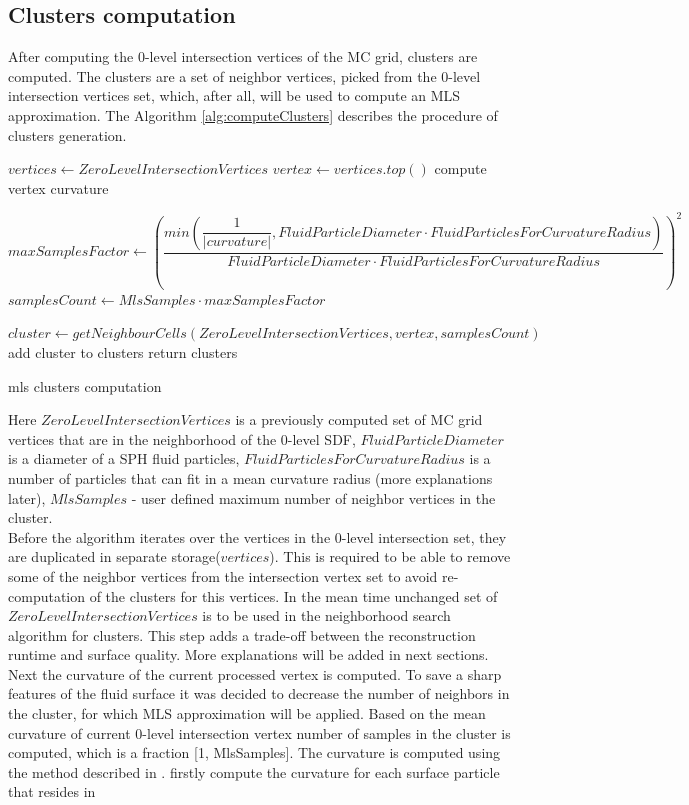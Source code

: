 \subsection{Clusters computation}
After computing the 0-level intersection vertices of the MC grid, clusters are computed. The clusters are a set of neighbor vertices, picked from the 0-level intersection vertices set, which, after all, will be used to compute an MLS approximation. The Algorithm \ref{alg:computeClusters} describes the procedure of clusters generation.
\begin{algorithm}[H]
	\scriptsize
	\begin{algorithmic}
			\State $vertices \gets ZeroLevelIntersectionVertices$
				\State $vertex \gets vertices.top()$
				\State compute vertex curvature

				\State $maxSamplesFactor \gets \left(\dfrac{min(\dfrac{1}{|curvature|}, FluidParticleDiameter \cdot FluidParticlesForCurvatureRadius)}{FluidParticleDiameter \cdot FluidParticlesForCurvatureRadius}\right)^2$
				\State $samplesCount \gets MlsSamples \cdot maxSamplesFactor$

				\State $cluster \gets getNeighbourCells(ZeroLevelIntersectionVertices, vertex, samplesCount)$
				\State add cluster to clusters
			\EndWhile
			\State return clusters
	\end{algorithmic}
	\caption{mls clusters computation}
	\label{alg:computeClusters}
\end{algorithm}
Here $ZeroLevelIntersectionVertices$ is a previously computed set of MC grid vertices  that are in the neighborhood of the 0-level SDF,  
$FluidParticleDiameter$ is a diameter of a SPH fluid particles, $FluidParticlesForCurvatureRadius$ is a number of particles that can fit in a mean curvature radius (more explanations later), $MlsSamples$ - user defined maximum number of neighbor vertices in the cluster.\\
Before the algorithm iterates over the vertices in the 0-level intersection set, they are duplicated in separate storage($vertices$). This is required to be able to remove some of the neighbor vertices from the intersection vertex set to avoid re-computation of the clusters for this vertices. In the mean time unchanged set of $ZeroLevelIntersectionVertices$ is to be used in the neighborhood search algorithm for clusters. This step adds a trade-off between the reconstruction runtime and surface quality. More explanations will be added in next sections.\\
Next the curvature of the current processed vertex is computed. To save a sharp features of the fluid surface it was decided to decrease the number of neighbors in the cluster, for which MLS approximation will be applied. Based on the mean curvature of current 0-level intersection vertex number of samples in the cluster is computed, which is a fraction [1, MlsSamples]. The curvature is computed using the method described in \cite{CurvatureComputation}. firstly compute the curvature for each surface particle that resides in
